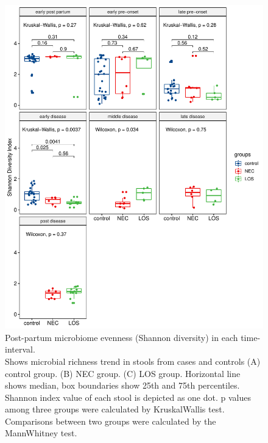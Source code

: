 \documentclass[fleqn,10pt]{wlpeerj} %
\begin{document}
\begin{figure}[ht]\centering
  \includegraphics[width=\linewidth]{Shannon-time-groups.pdf}
  \caption{Post-partum microbiome evenness (Shannon diversity) in each time-interval. \\ Shows microbial richness trend in stools from cases and controls (A) control group. (B) NEC group. (C) LOS group. Horizontal line shows median, box boundaries show 25th and 75th percentiles.  Shannon index value of each stool is depicted as one dot. p values among three groups were calculated by Kruskal\-Wallis test. Comparisons between two groups were calculated by the Mann\-Whitney test. }
  \label{fig:Shannon-time-groups}
\end{figure}
\end{document}
